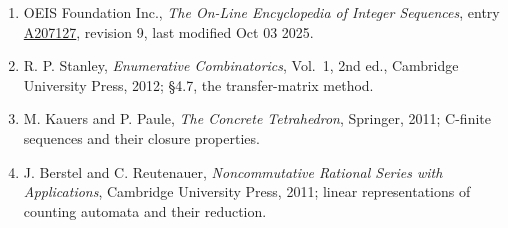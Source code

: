 \documentclass[11pt]{article}
\theoremstyle{definition}
\begin{document}
\begin{enumerate}

\item OEIS Foundation Inc., \emph{The On-Line Encyclopedia of Integer Sequences}, entry \href{https://oeis.org/A207127}{A207127}, revision 9, last modified Oct 03 2025.

\item R. P. Stanley, \emph{Enumerative Combinatorics}, Vol.~1, 2nd ed., Cambridge University Press, 2012; \S4.7, the transfer-matrix method.

\item M. Kauers and P. Paule, \emph{The Concrete Tetrahedron}, Springer, 2011; C-finite sequences and their closure properties.

\item J. Berstel and C. Reutenauer, \emph{Noncommutative Rational Series with Applications}, Cambridge University Press, 2011; linear representations of counting automata and their reduction.

\end{enumerate}
\end{document}
